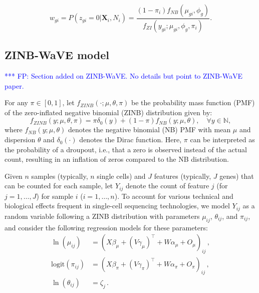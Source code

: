\documentclass{bmcart}
\newcommand{\fanny}[1]{\textcolor{blue}{*** FP: #1}}
\newcommand{\mb}[1]{\boldsymbol{\mathbf{#1}}}
\begin{document}
\[  w_{gi} = P(z_{gi}=0 | \mb{X}_i, N_i) =\frac{(1-\pi_i)f_{NB}(\mu_{gi},\phi_g)}{f_{ZI}(y_{gi}; \mu_{gi}, \phi_g, \pi_i)}.\]

\subsection*{ZINB-WaVE model}

\fanny{Section added on ZINB-WaVE. No details but point to ZINB-WaVE paper.}\\

{\color{blue} For any \(\pi\in[0,1]\), let \(f_{ZINB}( \cdot;\mu,\theta, \pi)\) be the probability mass function (PMF) of the zero-inflated negative binomial (ZINB) distribution given by:
\begin{equation}
f_{ZINB}(y;\mu,\theta, \pi) = \pi \delta_0(y) + (1-\pi) f_{NB}(y;\mu,\theta), \quad \forall y\in\mathbb{N},
\end{equation} 
where 
$f_{NB}(y;\mu,\theta)$ denotes the negative binomial (NB) PMF with mean $\mu$ and dispersion $\theta$ and \(\delta_0(\cdot)\) denotes the Dirac function. Here, \(\pi\) can be
interpreted as the probability of a droupout, i.e., that a zero is observed instead of the
actual count, resulting in an inflation of zeros compared to the NB distribution. 

Given \(n\) samples (typically, \(n\) single cells) and \(J\) features
(typically, \(J\) genes) that can be counted for each sample, let
\(Y_{ij}\) denote the count of feature \(j\) (for \(j=1,\ldots,J\)) for
sample \(i\) (\(i=1,\ldots,n\)). To account for various technical and
biological effects frequent in single-cell sequencing
technologies, we model \(Y_{ij}\) as a random variable following a ZINB
distribution with parameters \(\mu_{ij}\), \(\theta_{ij}\), and
\(\pi_{ij}\), and consider the following regression models for these parameters:
\begin{align}
\label{eq:model1}
\ln(\mu_{ij}) &= \left( X\beta_\mu + (V\gamma_\mu)^\top + W\alpha_\mu + O_\mu\right)_{ij}\,,\\
\label{eq:model2}
\text{logit}(\pi_{ij}) &= \left(X\beta_\pi + (V\gamma_\pi)^\top + W\alpha_\pi + O_\pi\right)_{ij} \,, \\
\label{eq:model3}
\ln(\theta_{ij}) &= \zeta_j \,.
\end{align}

}
\end{document}
